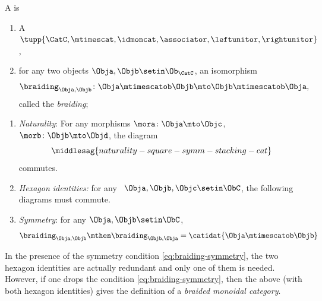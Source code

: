 \begin{ctdefinition}
    \label{def:symmetric-monoidal-category}
    A  is

    \constit
    \begin{enumerate}
        \item A ~$\tupp{\CatC, \mtimescat, \idmoncat, \associator, \leftunitor, \rightunitor}$,
        \item for any two objects $\Obja, \Objb \setin \Ob_\CatC$, an isomorphism
              \begin{equation}
                  \braiding_{\Obja, \Objb} \colon \Obja \mtimescatob \Objb \mto \Objb \mtimescatob \Obja,
              \end{equation}
              called the \emph{braiding};
    \end{enumerate}

    \condit

    \begin{enumerate}
        \item \emph{Naturality}: For any morphisms $\mora \colon \Obja \mto \Objc$, $\morb \colon \Objb \mto \Objd$, the diagram
              \begin{equation}\label{eq:naturality-square-symm-stacking-cat-again}
                  \middlesag{naturality-square-symm-stacking-cat}
              \end{equation}
              commutes.
        \item \emph{Hexagon identities:}
              for any ~$\Obja,\Objb,\Objc\setin \ObC$, the following diagrams must commute.
        \item \emph{Symmetry}: for any $\Obja, \Objb \setin \ObC$,
              \begin{equation}
                  \label{eq:braiding-symmetry}
                  \braiding_{\Obja,\Objb} \mthen \braiding_{\Objb,\Obja} = \catidat{\Obja \mtimescatob \Objb}
              \end{equation}
    \end{enumerate}

\end{ctdefinition}


\begin{remark}
    In the presence of the symmetry condition \cref{eq:braiding-symmetry}, the two hexagon identities are actually redundant and only one of them is needed.
    However, if one drops the condition \cref{eq:braiding-symmetry}, then the above (with both hexagon identities) gives the definition of a \emph{braided monoidal category}.
\end{remark}

